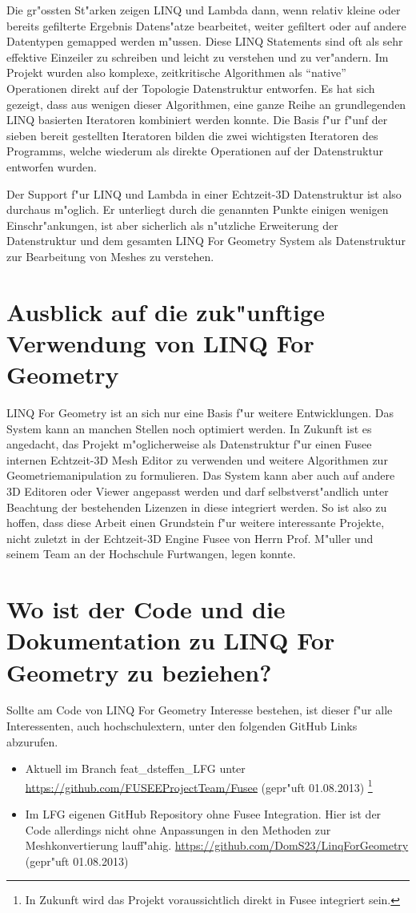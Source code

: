 \documentclass[pagesize, paper=a4, fontsize=12pt,titlepage=true, headings=small, headnosepline, abstractoff, liststotoc, nochapterprefix, plainheadsepline]{scrreprt}
\newcommand{\LFG}{LINQ For Geometry}
\newcommand{\LFGS}{LINQ For Geometry }
\begin{document}
Die gr"ossten St"arken zeigen LINQ und Lambda dann, wenn relativ kleine oder bereits gefilterte Ergebnis Datens"atze bearbeitet, weiter gefiltert oder auf andere Datentypen gemapped werden m"ussen. Diese LINQ Statements sind oft als sehr effektive Einzeiler zu schreiben und leicht zu verstehen und zu ver"andern. Im Projekt wurden also komplexe, zeitkritische Algorithmen als "`native"' Operationen direkt auf der Topologie Datenstruktur entworfen. Es hat sich gezeigt, dass aus wenigen dieser Algorithmen, eine ganze Reihe an grundlegenden LINQ basierten Iteratoren kombiniert werden konnte. Die Basis f"ur f"unf der sieben bereit gestellten Iteratoren bilden die zwei wichtigsten Iteratoren des Programms, welche wiederum als direkte Operationen auf der Datenstruktur entworfen wurden.


Der Support f"ur LINQ und Lambda in einer Echtzeit-3D Datenstruktur ist also durchaus m"oglich. Er unterliegt durch die genannten Punkte einigen wenigen Einschr"ankungen, ist aber sicherlich als n"utzliche Erweiterung der Datenstruktur und dem gesamten \LFGS System als Datenstruktur zur Bearbeitung von Meshes zu verstehen.
\section{Ausblick auf die zuk"unftige Verwendung von \LFG}
\LFGS ist an sich nur eine Basis f"ur weitere Entwicklungen. Das System kann an manchen Stellen noch optimiert werden. In Zukunft ist es angedacht, das Projekt m"oglicherweise als Datenstruktur f"ur einen Fusee internen Echtzeit-3D Mesh Editor zu verwenden und weitere Algorithmen zur Geometriemanipulation zu formulieren. Das System kann aber auch auf andere 3D Editoren oder Viewer angepasst werden und darf selbstverst"andlich unter Beachtung der bestehenden Lizenzen in diese integriert werden. So ist also zu hoffen, dass diese Arbeit einen Grundstein f"ur weitere interessante Projekte, nicht zuletzt in der Echtzeit-3D Engine Fusee von Herrn Prof. M"uller und seinem Team an der Hochschule Furtwangen, legen konnte.

\newpage
\section {Wo ist der Code und die Dokumentation zu \LFGS zu beziehen?}
	Sollte am Code von \LFGS Interesse bestehen, ist dieser f"ur alle Interessenten, auch hochschulextern, unter den folgenden GitHub Links abzurufen.
\begin{itemize}
\item Aktuell im Branch feat\_dsteffen\_LFG unter \url{https://github.com/FUSEEProjectTeam/Fusee} (gepr"uft 01.08.2013) \footnote{In Zukunft wird das Projekt voraussichtlich direkt in Fusee integriert sein.}
\item Im LFG eigenen GitHub Repository ohne Fusee Integration. Hier ist der Code allerdings nicht ohne Anpassungen in den Methoden zur Meshkonvertierung lauff"ahig. \url{https://github.com/DomS23/LinqForGeometry} (gepr"uft 01.08.2013)
\end{itemize}
\end{document}
